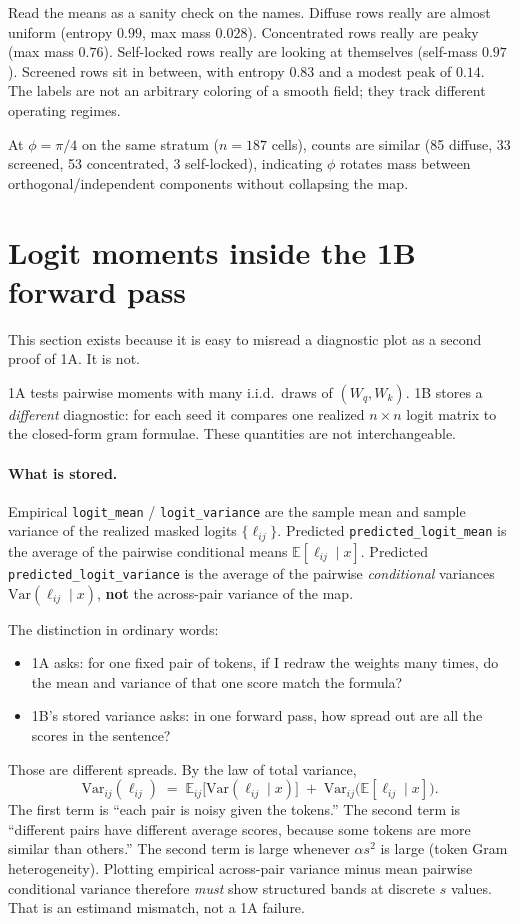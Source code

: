 \documentclass[11pt,a4paper]{report}
\begin{document}
Read the means as a sanity check on the names. Diffuse rows really are almost uniform (entropy $0.99$, max mass $0.028$). Concentrated rows really are peaky (max mass $0.76$). Self-locked rows really are looking at themselves (self-mass $0.97$). Screened rows sit in between, with entropy $0.83$ and a modest peak of $0.14$. The labels are not an arbitrary coloring of a smooth field; they track different operating regimes.

At $\phi=\pi/4$ on the same stratum ($n=187$ cells), counts are similar (85 diffuse, 33 screened, 53 concentrated, 3 self-locked), indicating $\phi$ rotates mass between orthogonal/independent components without collapsing the map.

\section{Logit moments inside the 1B forward pass}
\label{sec:1b-moments}

This section exists because it is easy to misread a diagnostic plot as a second proof of 1A. It is not.

1A tests pairwise moments with many i.i.d.\ draws of $(W_q,W_k)$. 1B stores a \emph{different} diagnostic: for each seed it compares one realized $n\times n$ logit matrix to the closed-form gram formulae. These quantities are not interchangeable.

\paragraph{What is stored.}
Empirical \texttt{logit\_mean} / \texttt{logit\_variance} are the sample mean and sample variance of the realized masked logits $\{\ell_{ij}\}$. Predicted \texttt{predicted\_logit\_mean} is the average of the pairwise conditional means $\mathbb{E}[\ell_{ij}\mid x]$. Predicted \texttt{predicted\_logit\_variance} is the average of the pairwise \emph{conditional} variances $\mathrm{Var}(\ell_{ij}\mid x)$, \textbf{not} the across-pair variance of the map.

The distinction in ordinary words:
\begin{itemize}[leftmargin=*]
  \item 1A asks: for one fixed pair of tokens, if I redraw the weights many times, do the mean and variance of that one score match the formula?
  \item 1B's stored variance asks: in one forward pass, how spread out are all the scores in the sentence?
\end{itemize}
Those are different spreads. By the law of total variance,
\[
\mathrm{Var}_{ij}(\ell_{ij})
\;=\;
\mathbb{E}_{ij}\!\bigl[\mathrm{Var}(\ell_{ij}\mid x)\bigr]
\;+\;
\mathrm{Var}_{ij}\!\bigl(\mathbb{E}[\ell_{ij}\mid x]\bigr).
\]
The first term is ``each pair is noisy given the tokens.'' The second term is ``different pairs have different average scores, because some tokens are more similar than others.'' The second term is large whenever $\alpha s^2$ is large (token Gram heterogeneity). Plotting empirical across-pair variance minus mean pairwise conditional variance therefore \emph{must} show structured bands at discrete $s$ values. That is an estimand mismatch, not a 1A failure.
\end{document}
